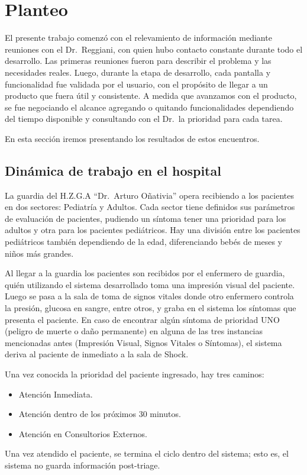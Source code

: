 \section{Planteo}

El presente trabajo comenzó con el relevamiento de información mediante reuniones con el Dr.\ Reggiani, con quien hubo contacto constante durante todo el desarrollo. Las primeras reuniones fueron para describir el problema y las necesidades reales. Luego, durante la etapa de desarrollo, cada pantalla y funcionalidad fue validada por el usuario, con el propósito de llegar a un producto que fuera útil y consistente. A medida que avanzamos con el producto, se fue negociando el alcance agregando o quitando funcionalidades dependiendo del tiempo disponible y consultando con el Dr.\ la prioridad para cada tarea.

En esta sección iremos presentando los resultados de estos encuentros.


\subsection{Dinámica de trabajo en el hospital}
La guardia del H.Z.G.A ``Dr.\ Arturo Oñativia'' opera recibiendo a los pacientes en dos sectores: Pediatría y Adultos. Cada sector tiene definidos sus parámetros de evaluación de pacientes, pudiendo un síntoma tener una prioridad para los adultos y otra para los pacientes pediátricos. Hay una división entre los pacientes pediátricos también dependiendo de la edad, diferenciando bebés de meses y niños más grandes.

Al llegar a la guardia los pacientes son recibidos por el enfermero de guardia, quién utilizando el sistema desarrollado toma una impresión visual del paciente. Luego se pasa a la sala de toma de signos vitales donde otro enfermero controla la presión, glucosa en sangre, entre otros, y graba en el sistema los síntomas que presenta el paciente. En caso de encontrar algún síntoma de prioridad UNO (peligro de muerte o daño permanente) en alguna de las tres instancias mencionadas antes (Impresión Visual, Signos Vitales o Síntomas), el sistema deriva al paciente de inmediato a la sala de Shock.  

Una vez conocida la prioridad del paciente ingresado, hay tres caminos: 
\begin{itemize}
\item Atención Inmediata.
\item Atención dentro de los próximos 30 minutos. 
\item Atención en Consultorios Externos.
\end{itemize}
Una vez atendido el paciente, se termina el ciclo dentro del sistema; esto es, el sistema no guarda información post-triage. 



